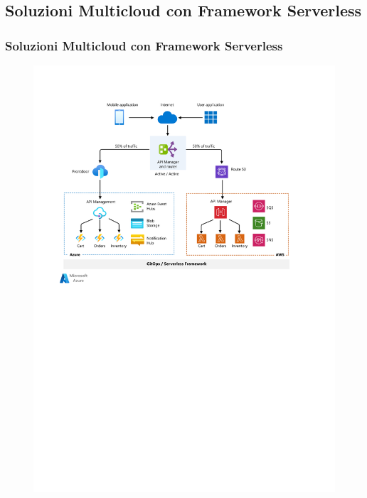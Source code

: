 \documentclass{beamer}
\begin{document}
	\subsection{Soluzioni Multicloud con Framework Serverless}
	\begin{frame}
		\frametitle{Soluzioni Multicloud con Framework Serverless}
		\begin{figure}
			\includegraphics[width=\textwidth]{img/multi-cloud-serverless-architecture.pdf}
		\end{figure}
	\end{frame}
	
\end{document}
